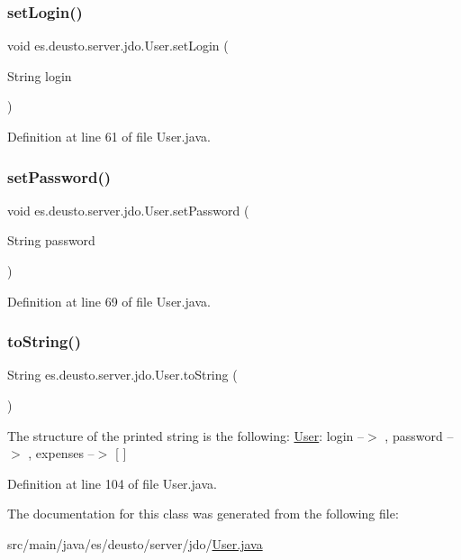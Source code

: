 \subsubsection{\texorpdfstring{set\+Login()}{setLogin()}}
{\footnotesize\ttfamily void es.\+deusto.\+server.\+jdo.\+User.\+set\+Login (\begin{DoxyParamCaption}\item[{String}]{login }\end{DoxyParamCaption})}



Definition at line 61 of file User.\+java.

\mbox{\label{classes_1_1deusto_1_1server_1_1jdo_1_1_user_a2e052b5a7cab949f61580edf44bbd233}} 
\subsubsection{\texorpdfstring{set\+Password()}{setPassword()}}
{\footnotesize\ttfamily void es.\+deusto.\+server.\+jdo.\+User.\+set\+Password (\begin{DoxyParamCaption}\item[{String}]{password }\end{DoxyParamCaption})}



Definition at line 69 of file User.\+java.

\mbox{\label{classes_1_1deusto_1_1server_1_1jdo_1_1_user_a65366a578a6dcc53e3a77d6eabbbf8cf}} 
\subsubsection{\texorpdfstring{to\+String()}{toString()}}
{\footnotesize\ttfamily String es.\+deusto.\+server.\+jdo.\+User.\+to\+String (\begin{DoxyParamCaption}{ }\end{DoxyParamCaption})}

The structure of the printed string is the following\+: \hyperlink{classes_1_1deusto_1_1server_1_1jdo_1_1_user}{User}\+: login --$>$ , password --$>$ , expenses --$>$ \mbox{[} \mbox{]} 

Definition at line 104 of file User.\+java.



The documentation for this class was generated from the following file\+:\begin{DoxyCompactItemize}
\item 
src/main/java/es/deusto/server/jdo/\hyperlink{_user_8java}{User.\+java}\end{DoxyCompactItemize}
